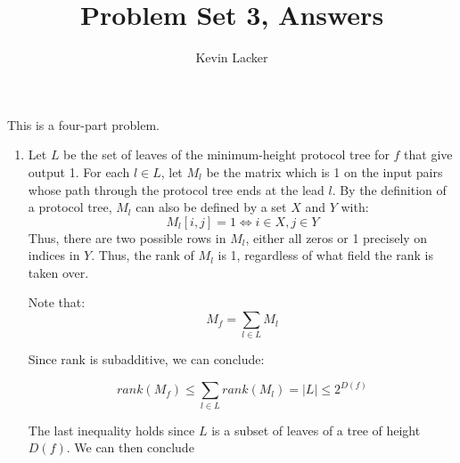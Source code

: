 \documentclass{article}
\newenvironment{problem}[2][Problem]{\begin{trivlist}
\item[\hskip \labelsep {\bfseries #1}\hskip \labelsep {\bfseries #2.}]}{\end{trivlist}}
\begin{document}
\title{Problem Set 3, Answers}
\author{Kevin Lacker}
\maketitle

\begin{problem}{1}
  This is a four-part problem.
  \begin{enumerate}
    \item Let $L$ be the set of leaves of the minimum-height protocol
      tree for $f$ that
      give output 1. For each $l \in L$, let $M_l$ be the matrix which
      is 1 on the input pairs whose path through the protocol tree
      ends at the lead $l$. By the definition of a protocol tree,
      $M_l$ can also be defined by a set $X$ and $Y$ with:
      \begin{equation}
        M_l[i,j] = 1 \iff i \in X, j \in Y
      \end{equation}
      Thus, there are two possible rows in
      $M_l$, either all zeros or 1 precisely on indices in $Y$. Thus,
      the rank of $M_l$ is 1, regardless of what field the rank is
      taken over.

      Note that:
      \begin{equation}
        M_f = \sum_{l \in L} M_l
      \end{equation}

      Since rank is subadditive, we can conclude:

      \begin{equation}
        rank(M_f) \leq \sum_{l \in L} rank(M_l) = |L| \leq 2^{D(f)}
      \end{equation}

      The last inequality holds since $L$ is a subset of leaves of a
      tree of height $D(f)$. We can then conclude


\end{enumerate}
\end{problem}
\end{document}
